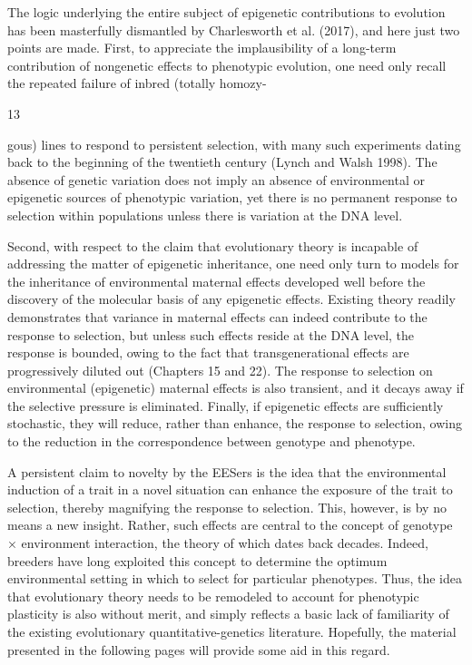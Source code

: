 \documentclass{article}
\begin{document}
The logic underlying the entire subject of epigenetic contributions to evolution has been masterfully dismantled by Charlesworth et al. (2017), and here just two points are made. First, to appreciate the implausibility of a long-term contribution of nongenetic effects to phenotypic evolution, one need only recall the repeated failure of inbred (totally homozy-

13

gous) lines to respond to persistent selection, with many such experiments dating back to the beginning of the twentieth century (Lynch and Walsh 1998). The absence of genetic variation does not imply an absence of environmental or epigenetic sources of phenotypic variation, yet there is no permanent response to selection within populations unless there is variation at the DNA level.

Second, with respect to the claim that evolutionary theory is incapable of addressing the matter of epigenetic inheritance, one need only turn to models for the inheritance of environmental maternal effects developed well before the discovery of the molecular basis of any epigenetic effects. Existing theory readily demonstrates that variance in maternal effects can indeed contribute to the response to selection, but unless such effects reside at the DNA level, the response is bounded, owing to the fact that transgenerational effects are progressively diluted out (Chapters 15 and 22). The response to selection on environmental (epigenetic) maternal effects is also transient, and it decays away if the selective pressure is eliminated. Finally, if epigenetic effects are sufficiently stochastic, they will reduce, rather than enhance, the response to selection, owing to the reduction in the correspondence between genotype and phenotype.

A persistent claim to novelty by the EESers is the idea that the environmental induction of a trait in a novel situation can enhance the exposure of the trait to selection, thereby magnifying the response to selection. This, however, is by no means a new insight. Rather, such effects are central to the concept of genotype × environment interaction, the theory of which dates back decades. Indeed, breeders have long exploited this concept to determine the optimum environmental setting in which to select for particular phenotypes. Thus, the idea that evolutionary theory needs to be remodeled to account for phenotypic plasticity is also without merit, and simply reflects a basic lack of familiarity of the existing evolutionary quantitative-genetics literature. Hopefully, the material presented in the following pages will provide some aid in this regard.
\end{document}

